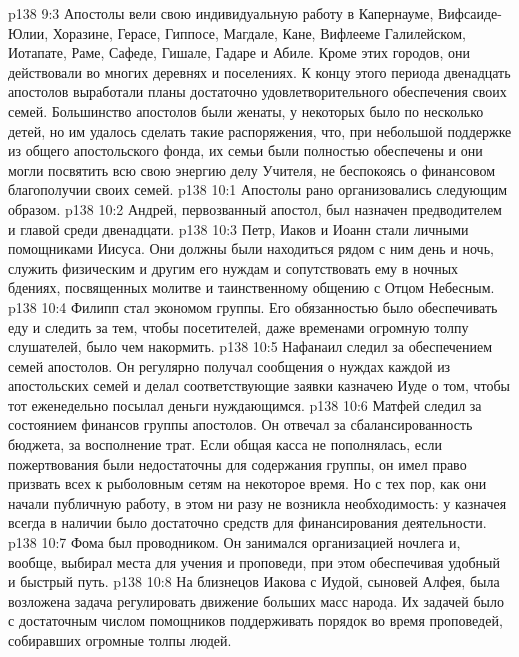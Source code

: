 \vs p138 9:3 \pc Апостолы вели свою индивидуальную работу в Капернауме, Вифсаиде\hyp{}Юлии, Хоразине, Герасе, Гиппосе, Магдале, Кане, Вифлееме Галилейском, Иотапате, Раме, Сафеде, Гишале, Гадаре и Абиле. Кроме этих городов, они действовали во многих деревнях и поселениях. К концу этого периода двенадцать апостолов выработали планы достаточно удовлетворительного обеспечения своих семей. Большинство апостолов были женаты, у некоторых было по несколько детей, но им удалось сделать такие распоряжения, что, при небольшой поддержке из общего апостольского фонда, их семьи были полностью обеспечены и они могли посвятить всю свою энергию делу Учителя, не беспокоясь о финансовом благополучии своих семей.
\vs p138 10:1 Апостолы рано организовались следующим образом.
\vs p138 10:2 \bibnobreakspace Андрей, первозванный апостол, был назначен предводителем и главой среди двенадцати.
\vs p138 10:3 \bibnobreakspace Петр, Иаков и Иоанн стали личными помощниками Иисуса. Они должны были находиться рядом с ним день и ночь, служить физическим и другим его нуждам и сопутствовать ему в ночных бдениях, посвященных молитве и таинственному общению с Отцом Небесным.
\vs p138 10:4 \bibnobreakspace Филипп стал экономом группы. Его обязанностью было обеспечивать еду и следить за тем, чтобы посетителей, даже временами огромную толпу слушателей, было чем накормить.
\vs p138 10:5 \bibnobreakspace Нафанаил следил за обеспечением семей апостолов. Он регулярно получал сообщения о нуждах каждой из апостольских семей и делал соответствующие заявки казначею Иуде о том, чтобы тот еженедельно посылал деньги нуждающимся.
\vs p138 10:6 \bibnobreakspace Матфей следил за состоянием финансов группы апостолов. Он отвечал за сбалансированность бюджета, за восполнение трат. Если общая касса не пополнялась, если пожертвования были недостаточны для содержания группы, он имел право призвать всех к рыболовным сетям на некоторое время. Но с тех пор, как они начали публичную работу, в этом ни разу не возникла необходимость: у казначея всегда в наличии было достаточно средств для финансирования деятельности.
\vs p138 10:7 \bibnobreakspace Фома был проводником. Он занимался организацией ночлега и, вообще, выбирал места для учения и проповеди, при этом обеспечивая удобный и быстрый путь.
\vs p138 10:8 \bibnobreakspace На близнецов Иакова с Иудой, сыновей Алфея, была возложена задача регулировать движение больших масс народа. Их задачей было с достаточным числом помощников поддерживать порядок во время проповедей, собиравших огромные толпы людей.

